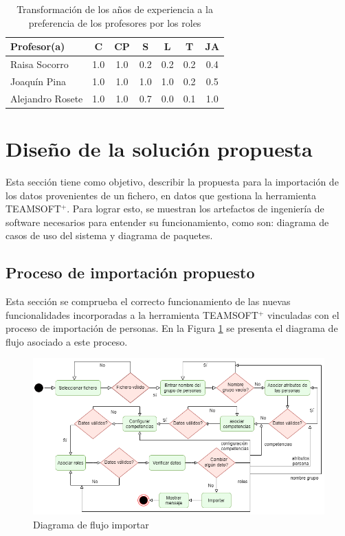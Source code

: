 \begin{table}[H]
	\centering
	\caption{Transformación de los años de experiencia a la preferencia de los profesores por los roles}\label{trans-prof}
	\begin{tabular}{l c c c c c c}
		\toprule[1.7pt]
		Profesor(a) & C   & CP  & S   & L   & T   & JA  \\ \midrule
		Raisa Socorro                             & 1.0 & 1.0 & 0.2 & 0.2 & 0.2 & 0.4 \\
		\rowcolor{gray!30} Joaquín Pina                              & 1.0 & 1.0 & 1.0 & 1.0 & 0.2 & 0.5 \\
		Alejandro Rosete                          & 1.0 & 1.0 & 0.7 & 0.0 & 0.1 & 1.0 \\
		\bottomrule[1pt]          
	\end{tabular}
\end{table}

\section{Diseño de la solución propuesta} \label{sec:diseno-solucion}

Esta sección tiene como objetivo, describir la propuesta para la importación de los datos provenientes de un fichero, en datos que gestiona la herramienta TEAMSOFT$^+$. Para lograr esto, se muestran los artefactos de ingeniería de software necesarios para entender su funcionamiento, como son: diagrama de casos de uso del sistema y diagrama de paquetes.


\subsection{Proceso de importación propuesto}
Esta sección se comprueba el correcto funcionamiento de las nuevas funcionalidades incorporadas a la herramienta TEAMSOFT$^+$ vinculadas con el proceso de importación de personas. En la Figura \ref{fig:diagrama-flujo-importar} se presenta el diagrama de flujo asociado a este proceso. 

\begin{figure}[H]
	\centering
	\includegraphics[width=.83\textwidth]{figuras/diagramas-teamsoft-Flujo-Importar.png}
	\caption{Diagrama de flujo importar} \label{fig:diagrama-flujo-importar}
\end{figure}

